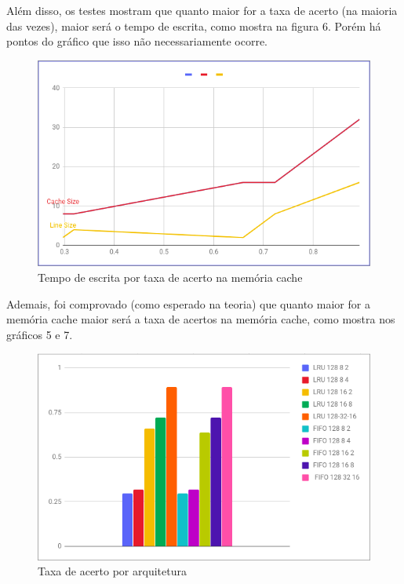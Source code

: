 \documentclass[conference]{IEEEtran}
\begin{document}
Além disso, os testes mostram que quanto maior for a taxa de acerto (na maioria das vezes), maior será o tempo de escrita, como mostra na figura 6. Porém há pontos do gráfico que isso não necessariamente ocorre.

\begin{figure}[H]
    \includegraphics[width=\linewidth]{Imagens/WRITE_TIME_POR_HIT_RATE.png}
    \caption{Tempo de escrita por taxa de acerto na memória cache}
    \label{fig:Tempo de escrita por taxa de acerto na memória cache}
\end{figure}

Ademais, foi comprovado (como esperado na teoria) que quanto maior for a memória cache maior será a taxa de acertos na memória cache, como mostra nos gráficos 5 e 7.

\begin{figure}[H]
    \includegraphics[width=\linewidth]{Imagens/HIT_RATE_POR_ARQUITETURA.png}
    \caption{Taxa de acerto por arquitetura}
    \label{fig:Taxa de acerto por arquitetura}
\end{figure}
\end{document}
